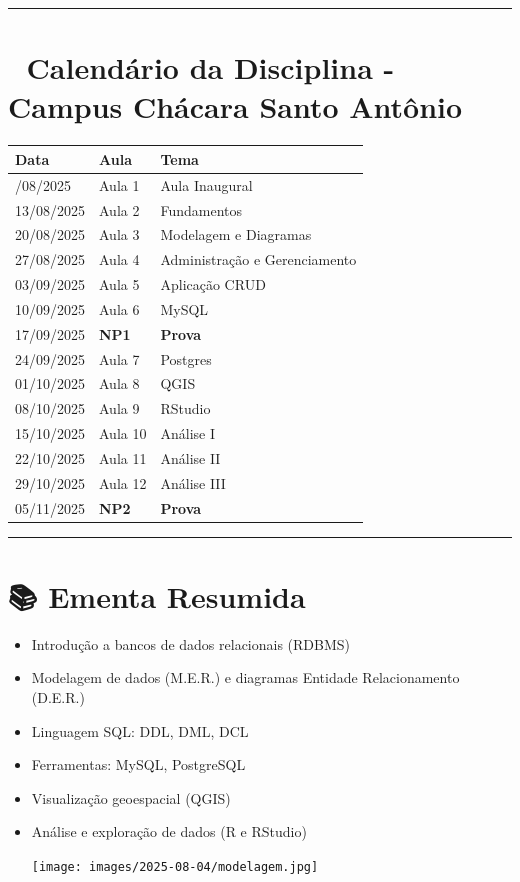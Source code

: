 \documentclass[
]{book}
\begin{document}
\begin{center}\rule{0.5\linewidth}{0.5pt}\end{center}

\chapter{📅 Calendário da Disciplina - Campus Chácara Santo Antônio}\label{calenduxe1rio-da-disciplina---campus-chuxe1cara-santo-antuxf4nio}

\begin{longtable}[]{@{}lll@{}}
\toprule\noalign{}
Data & Aula & Tema \\
\midrule\noalign{}
\endhead
\bottomrule\noalign{}
\endlastfoot
06/08/2025 & Aula 1 & Aula Inaugural \\
13/08/2025 & Aula 2 & Fundamentos \\
20/08/2025 & Aula 3 & Modelagem e Diagramas \\
27/08/2025 & Aula 4 & Administração e Gerenciamento \\
03/09/2025 & Aula 5 & Aplicação CRUD \\
10/09/2025 & Aula 6 & MySQL \\
17/09/2025 & \textbf{NP1} & \textbf{Prova} \\
24/09/2025 & Aula 7 & Postgres \\
01/10/2025 & Aula 8 & QGIS \\
08/10/2025 & Aula 9 & RStudio \\
15/10/2025 & Aula 10 & Análise I \\
22/10/2025 & Aula 11 & Análise II \\
29/10/2025 & Aula 12 & Análise III \\
05/11/2025 & \textbf{NP2} & \textbf{Prova} \\
\end{longtable}

\begin{center}\rule{0.5\linewidth}{0.5pt}\end{center}

\chapter{📚 Ementa Resumida}\label{ementa-resumida}

\begin{itemize}
\item
  Introdução a bancos de dados relacionais (RDBMS)
\item
  Modelagem de dados (M.E.R.) e diagramas Entidade Relacionamento (D.E.R.)
\item
  Linguagem SQL: DDL, DML, DCL
\item
  Ferramentas: MySQL, PostgreSQL
\item
  Visualização geoespacial (QGIS)
\item
  Análise e exploração de dados (R e RStudio)

  \texttt{[image: images/2025-08-04/modelagem.jpg]}
\end{itemize}
\end{document}
